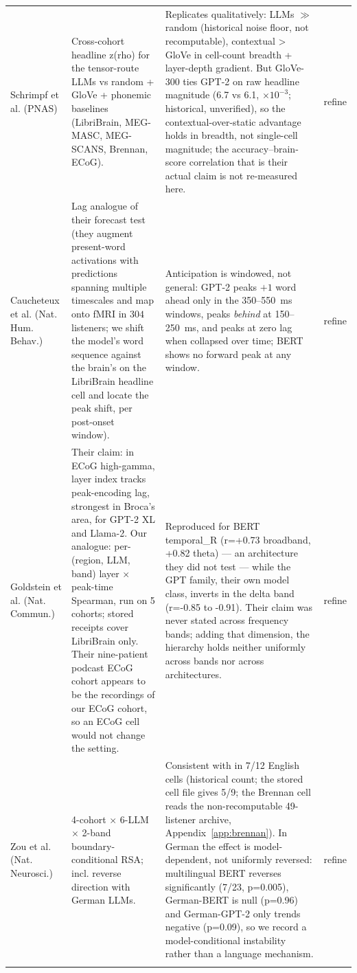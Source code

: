 \documentclass{article}
\begin{document}
\begin{longtable}{@{}p{2.1cm} p{3.8cm} p{5.1cm} p{1.5cm}@{}}
Schrimpf et al. (PNAS) & Cross-cohort headline z(rho) for the tensor-route LLMs vs random + GloVe + phonemic baselines (LibriBrain, MEG-MASC, MEG-SCANS, Brennan, ECoG). & Replicates qualitatively: LLMs $\gg$ random (historical noise floor, not recomputable), contextual > GloVe in cell-count breadth + layer-depth gradient. But GloVe-300 ties GPT-2 on raw headline magnitude (6.7 vs 6.1, $\times 10^{-3}$; historical, unverified), so the contextual-over-static advantage holds in breadth, not single-cell magnitude; the accuracy--brain-score correlation that is their actual claim is not re-measured here. & refine \\ \addlinespace
Caucheteux et al. (Nat. Hum. Behav.) & Lag analogue of their forecast test (they augment present-word activations with predictions spanning multiple timescales and map onto fMRI in $304$ listeners; we shift the model's word sequence against the brain's on the LibriBrain headline cell and locate the peak shift, per post-onset window). & Anticipation is windowed, not general: GPT-2 peaks $+1$ word ahead only in the 350--550~ms windows, peaks \emph{behind} at 150--250~ms, and peaks at zero lag when collapsed over time; BERT shows no forward peak at any window. & refine \\ \addlinespace
Goldstein et al. (Nat. Commun.) & Their claim: in ECoG high-gamma, layer index tracks peak-encoding lag, strongest in Broca's area, for GPT-2 XL and Llama-2. Our analogue: per-(region, LLM, band) layer $\times$ peak-time Spearman, run on 5 cohorts; stored receipts cover LibriBrain only. Their nine-patient podcast ECoG cohort appears to be the recordings of our ECoG cohort, so an ECoG cell would not change the setting. & Reproduced for BERT temporal\_R (r=+0.73 broadband, +0.82 theta) --- an architecture they did not test --- while the GPT family, their own model class, inverts in the delta band (r=-0.85 to -0.91). Their claim was never stated across frequency bands; adding that dimension, the hierarchy holds neither uniformly across bands nor across architectures. & refine \\ \addlinespace
Zou et al. (Nat. Neurosci.) & 4-cohort $\times$ 6-LLM $\times$ 2-band boundary-conditional RSA; incl. reverse direction with German LLMs. & Consistent with \citet{zou2026constituent} in 7/12 English cells (historical count; the stored cell file gives 5/9; the Brennan cell reads the non-recomputable 49-listener archive, Appendix~\ref{app:brennan}). In German the effect is model-dependent, not uniformly reversed: multilingual BERT reverses significantly (7/23, p=0.005), German-BERT is null (p=0.96) and German-GPT-2 only trends negative (p=0.09), so we record a model-conditional instability rather than a language mechanism. & refine \\ \addlinespace

\end{longtable}
\end{document}
